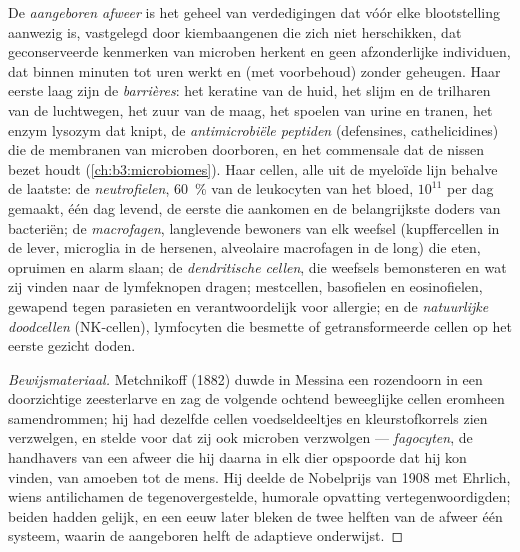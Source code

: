 \begin{definition}\label{def:b3:innate-immunity:innate}
De \emph{aangeboren afweer} is het geheel van verdedigingen dat vóór
elke blootstelling aanwezig is, vastgelegd door kiembaangenen die zich
niet herschikken, dat geconserveerde kenmerken van microben herkent en
geen afzonderlijke individuen, dat binnen minuten tot uren werkt en
(met voorbehoud) zonder geheugen. Haar eerste laag zijn de
\emph{barrières}: het keratine van de huid, het slijm en de trilharen
van de luchtwegen, het zuur van de maag, het spoelen van urine en
tranen, het enzym lysozym dat  knipt, de
\emph{antimicrobiële peptiden} (defensines, cathelicidines) die de
membranen van microben doorboren, en het commensale  dat de
nissen bezet houdt (\cref{ch:b3:microbiomes}). Haar cellen, alle uit de
myeloïde lijn behalve de laatste: de \emph{neutrofielen}, \qty{60}{\%}
van de leukocyten van het bloed, $10^{11}$ per dag gemaakt, één dag
levend, de eerste die aankomen en de belangrijkste doders van
bacteriën; de \emph{macrofagen}, langlevende bewoners van elk weefsel
(kupffercellen in de lever, microglia in de hersenen, alveolaire
macrofagen in de long) die eten, opruimen en alarm slaan; de
\emph{dendritische cellen}, die weefsels bemonsteren en wat zij vinden
naar de lymfeknopen dragen; mestcellen, basofielen en eosinofielen,
gewapend tegen parasieten en verantwoordelijk voor allergie; en de
\emph{natuurlijke doodcellen} (NK-cellen), lymfocyten die besmette of
getransformeerde cellen op het eerste gezicht doden.
\end{definition}

\begin{proof}[Bewijsmateriaal]
Metchnikoff (1882) duwde in Messina een rozendoorn in een doorzichtige
zeesterlarve en zag de volgende ochtend beweeglijke cellen eromheen
samendrommen; hij had dezelfde cellen voedseldeeltjes en
kleurstofkorrels zien verzwelgen, en stelde voor dat zij ook microben
verzwolgen --- \emph{fagocyten}, de handhavers van een afweer die hij
daarna in elk dier opspoorde dat hij kon vinden, van amoeben tot de
mens. Hij deelde de Nobelprijs van 1908 met Ehrlich, wiens antilichamen
de tegenovergestelde, humorale opvatting vertegenwoordigden; beiden
hadden gelijk, en een eeuw later bleken de twee helften van de afweer
één systeem, waarin de aangeboren helft de adaptieve onderwijst.
\end{proof}


